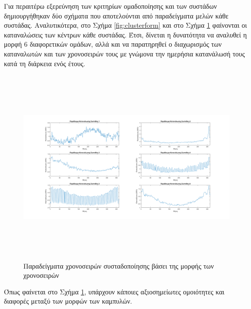 \newpage
Για περαιτέρω εξερεύνηση των κριτηρίων ομαδοποίησης και των συστάδων δημιουργήθηκαν δύο σχήματα που αποτελούνται από παραδείγματα μελών κάθε συστάδας. Αναλυτικότερα, στο Σχήμα \ref{fig:clusterform} και στο Σχήμα \ref{fig:clusterconslevel} φαίνονται οι καταναλώσεις των κέντρων κάθε συστάδας. Έτσι, δίνεται η δυνατότητα να αναλυθεί η μορφή 6 διαφορετικών ομάδων, αλλά και να παρατηρηθεί ο διαχωρισμός των καταναλωτών και των χρονοσειρών τους με γνώμονα την ημερήσια κατανάλωσή τους κατά τη διάρκεια ενός έτους.\par
\begin{figure}[ht!]
\centering
\includegraphics[width=180mm, height=100mm]{../../plots/Consumption_Analysis/gr_cluster_form.png}
\caption{Παραδείγματα χρονοσειρών συσταδοποίησης βάσει της μορφής των χρονοσειρών}
\label{fig:clusterconslevel}
\end{figure}
Όπως φαίνεται στο Σχήμα \ref{fig:clusterconslevel}, υπάρχουν κάποιες αξιοσημείωτες ομοιότητες και διαφορές μεταξύ των μορφών των καμπυλών.
